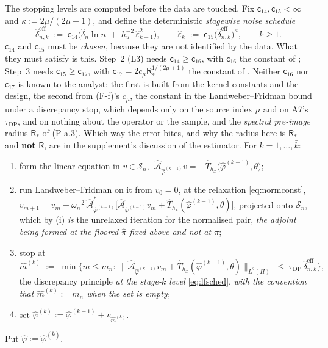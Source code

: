 \begin{definition}
The stopping levels are computed before the data are touched. Fix $\mathsf c_{14},\mathsf c_{15}<\infty$
and $\kappa:=2\mu/(2\mu+1)$, and define the deterministic \emph{stagewise noise schedule}
\begin{equation}\label{eq:lfsched}
\hat\delta^{\mathrm{eff}}_{n,k}\;:=\;\mathsf c_{14}\Big(\hat\delta_n\ln n\;+\;h_u^{-2}\,\hat\varepsilon_{k-1}^{2}\Big),
\qquad
\hat\varepsilon_{k}\;:=\;\mathsf c_{15}\big(\hat\delta^{\mathrm{eff}}_{n,k}\big)^{\kappa},
\qquad k\ge1 .
\end{equation}
$\mathsf c_{14}$ and $\mathsf c_{15}$ must be
\emph{chosen}, because they are not identified by the data. What they must satisfy is this.
 Step~2
(L3) needs $\mathsf c_{14}\ge\mathsf c_{16}$, with $\mathsf c_{16}$ the constant of ;
Step~3 needs $\mathsf c_{15}\ge\mathsf c_{17}$, with $\mathsf c_{17}=2c_\mu\mathsf R_\ast^{1/(2\mu+1)}$
the constant of . Neither $\mathsf c_{16}$ nor $\mathsf c_{17}$ is known to the analyst:
the first is built from the kernel constants and the design, the second from (F-f)'s $c_\mu$, the
constant in the Landweber--Fridman bound under a discrepancy stop, which depends only on the source
index $\mu$ and on A7's $\tau_{\mathrm{DP}}$, and on nothing about the operator or the sample, 
and the \emph{spectral pre-image} radius $\mathsf R_\ast$ of (P-a.3). Which way the error bites, and why the
radius here is $\mathsf R_\ast$ and \textbf{not} $\mathsf R$, are in the supplement's discussion of the
estimator. For $k=1,\dots,\bar k$:
\begin{enumerate}
\item[(a)] form the linear equation in $v\in\mathcal S_n$,
$\ \hat{\mathcal A}_{\hat\varphi^{(k-1)}}v=-\hat T_{h_x}\big(\hat\varphi^{(k-1)},\theta\big)$;
\item[(b)] run Landweber--Fridman on it from $v_0=0$, at the relaxation \eqref{eq:normconst},
$v_{m+1}=v_m-\omega_n^{-2}\,\hat{\mathcal A}^\ast_{\hat\varphi^{(k-1)}}\big[\hat{\mathcal A}_{\hat\varphi^{(k-1)}}v_m
+\hat T_{h_x}(\hat\varphi^{(k-1)},\theta)\big]$, projected onto $\mathcal S_n$, which by
(i) \emph{is} the unrelaxed iteration for the normalised pair, \emph{the
adjoint being formed at the floored $\hat\pi$ fixed above and not at $\pi$};
\item[(c)] stop at
\[
\hat m^{(k)}\;:=\;\min\Big\{m\le\bar m_n:\ \big\|\hat{\mathcal A}_{\hat\varphi^{(k-1)}}v_m
+\hat T_{h_x}(\hat\varphi^{(k-1)},\theta)\big\|_{L^{2}(\Pi)}\;\le\;
\tau_{\mathrm{DP}}\,\hat\delta^{\mathrm{eff}}_{n,k}\Big\},
\]
the discrepancy principle \emph{at the stage-$k$ level} \eqref{eq:lfsched}, \emph{with the convention
that $\hat m^{(k)}:=\bar m_n$ when the set is empty};
\item[(d)] set $\hat\varphi^{(k)}:=\hat\varphi^{(k-1)}+v_{\hat m^{(k)}}$.
\end{enumerate}
Put $\hat\varphi:=\hat\varphi^{(\bar k)}$.


\end{definition}
